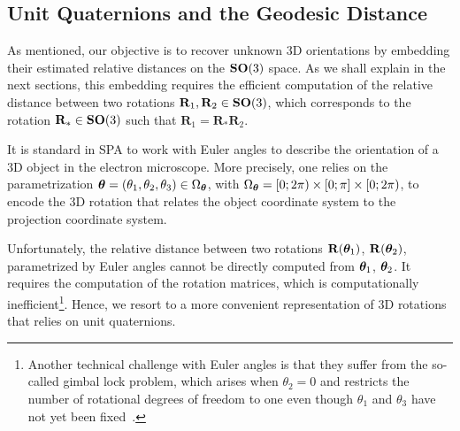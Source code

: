 \subsection{Unit Quaternions and the Geodesic Distance}
\label{sec:quaternions}

As mentioned, our objective is to recover unknown 3D orientations by embedding their estimated relative distances on the $\mathrm{\mathbf{SO}}(3)$ space. As we shall explain in the next sections, this embedding requires the efficient computation of the relative distance between two rotations $\mathbf{R}_1, \mathbf{R}_2 \in\mathrm{\mathbf{SO}}(3)$, which corresponds to the rotation $\mathbf{R}_*\in\mathrm{\mathbf{SO}}(3)$ such that $\mathbf{R}_1=\mathbf{R}_*\mathbf{R}_2$.

It is standard in SPA to work with Euler angles to describe the orientation of a 3D object in the electron microscope. More precisely, one relies on the parametrization ${\boldsymbol{\theta}}=(\theta_1,\theta_2,\theta_3)\in\Omega_{\boldsymbol{\theta}}$, with $\Omega_{\boldsymbol{\theta}}=[0;2\pi)\times [0;\pi] \times [0;2\pi)$, to encode the 3D rotation that relates the object coordinate system to the projection coordinate system.

Unfortunately, the relative distance between two rotations $\mathbf{R}({\boldsymbol{\theta}}_1)$, $\mathbf{R}({\boldsymbol{\theta}}_2)$, parametrized by Euler angles cannot be directly computed from ${\boldsymbol{\theta}}_1$, ${\boldsymbol{\theta}}_2$. It requires the computation of the rotation matrices, which is computationally inefficient\footnote{Another technical challenge with Euler angles is that they suffer from the so-called gimbal lock problem, which arises when $\theta_2=0$ and restricts the number of rotational degrees of freedom to one even though $\theta_1$ and $\theta_3$ have not yet been fixed~\cite{koks2006explorations}.}. Hence, we resort to a more convenient representation of 3D rotations that relies on unit quaternions.

